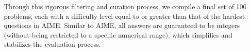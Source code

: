 Through this rigorous filtering and curation process, we compile a final set of 100 problems, each with a difficulty level equal to or greater than that of the hardest questions in AIME. Similar to AIME, all answers are guaranteed to be integers (without being restricted to a specific numerical range), which simplifies and stabilizes the evaluation process.




